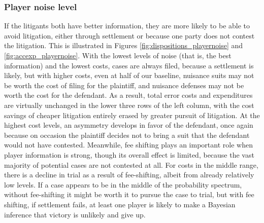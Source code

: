\documentclass{article}
\begin{document}
\subsubsection{Player noise level}

If the litigants both have better information, they are more likely to be able to avoid litigation, either through settlement or because one party does not contest the litigation. This is illustrated in Figures \ref{fig:dispositions_playernoise} and \ref{fig:accexp_playernoise}. With the lowest levels of noise (that is, the best information) and the lowest costs, cases are always filed, because a settlement is likely, but with higher costs, even at half of our baseline, nuisance suits may not be worth the cost of filing for the plaintiff, and nuisance defenses may not be worth the cost for the defendant. As a result, total error costs and expenditures are virtually unchanged in the lower three rows of the left column, with the cost savings of cheaper litigation entirely erased by greater pursuit of litigation. At the highest cost levels, an asymmetry develops in favor of the defendant, once again because on occasion the plaintiff decides not to bring a suit that the defendant would not have contested. Meanwhile, fee shifting plays an important role when player information is strong, though its overall effect is limited, because the vast majority of potential cases are not contested at all. For costs in the middle range, there is a decline in trial as a result of fee-shifting, albeit from already relatively low levels. If a case appears to be in the middle of the probability spectrum, without fee-shifting it might be worth it to pursue the case to trial, but with fee shifting, if settlement fails, at least one player is likely to make a Bayesian inference that victory is unlikely and give up. 
\end{document}
